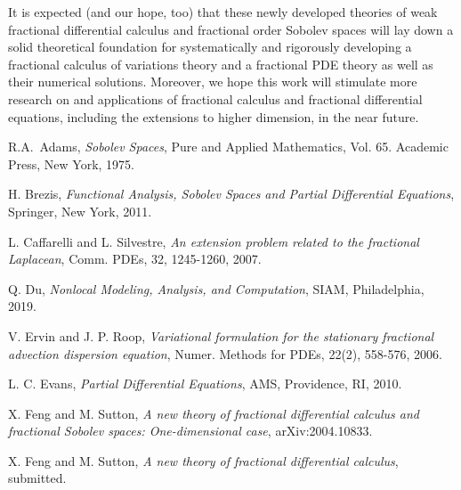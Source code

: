 \documentclass[leqno,final]{siamltex}
\numberwithin{equation}{section}
\renewcommand{\(}{\bigl(}
\renewcommand{\)}{\bigr)}
\begin{document}
   It is expected (and our hope, too) that these newly developed theories of weak fractional differential calculus and fractional order Sobolev spaces will lay down a solid theoretical foundation for systematically and rigorously developing a fractional calculus of variations theory and a fractional PDE theory as well as their numerical solutions. Moreover, we hope this work will stimulate more research on and applications of fractional calculus and fractional differential equations, including the extensions to higher dimension, in the near future.
   

\begin{thebibliography}{99}


{\sc R.A.~Adams}, 
{\em Sobolev Spaces}, 
Pure and  Applied Mathematics, Vol. 65. Academic Press, New York, 1975.


{\sc H. Brezis},
{\em Functional Analysis, Sobolev Spaces and Partial Differential Equations},
Springer, New York, 2011.

{\sc L. Caffarelli and L. Silvestre},
{\em An extension problem related to the fractional Laplacean}, 
Comm. PDEs,  32, 1245-1260, 2007.
 


{\sc Q. Du}, 
{\em Nonlocal Modeling, Analysis, and Computation}, 
SIAM, Philadelphia, 2019.


{\sc V. Ervin and J. P. Roop},
{\em Variational formulation for the stationary fractional advection dispersion equation},
Numer.  Methods for PDEs,  22(2), 558-576, 2006.

{\sc L. C. Evans}, 
{\em  Partial Differential Equations},  AMS, Providence, RI,  2010.

{\sc X. Feng and M. Sutton},
{\em A new theory of fractional differential calculus and fractional Sobolev spaces: One-dimensional case}, arXiv:2004.10833.

{\sc X. Feng and M. Sutton},
{\em A new theory of fractional differential calculus}, submitted.


\end{thebibliography}
\end{document}
